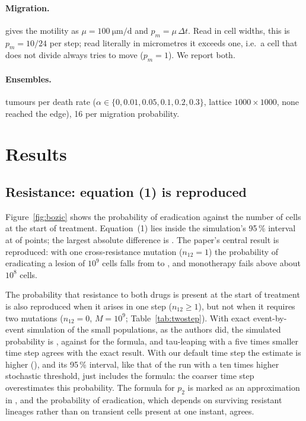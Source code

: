 \documentclass[11pt]{article}
\begin{document}
\paragraph{Migration.} \cite{poleszczuk2014} gives the motility as
$\mu=\SI{100}{\micro\meter\per\day}$ and $p_m=\mu\,\Delta t$. Read in cell widths, this is
$p_m = 10/24$ per step; read literally in micrometres it exceeds one, i.e.\ a cell that does
not divide always tries to move ($p_m=1$). We report both.

\paragraph{Ensembles.} \CATumours{} tumours per death rate ($\alpha\in\{0,0.01,0.05,0.1,0.2,0.3\}$,
lattice $1000\times1000$, none reached the edge), 16 per migration probability.

\section{Results}

\subsection{Resistance: equation (1) is reproduced}
Figure~\ref{fig:bozic} shows the probability of eradication against the number of cells at
the start of treatment. Equation~(1) lies inside the simulation's 95\,\% interval at
\BozicInside{} of \BozicPoints{} points; the largest absolute difference is \BozicMaxDiff{}.
The paper's central result is reproduced: with one cross-resistance mutation
($n_{12}=1$) the probability of eradicating a lesion of $10^9$ cells falls from
\BozicNoCross{} to \BozicOneCross{}, and monotherapy fails above about $10^8$ cells.

The probability that resistance to both drugs is present at the start of treatment is also
reproduced when it arises in one step ($n_{12}\ge 1$), but not when it requires two
mutations ($n_{12}=0$, $M=10^9$; Table~\ref{tab:twostep}). With exact event-by-event
simulation of the small populations, as the authors did, the simulated probability is
\BozicTwoStepExact{}, against \BozicTwoStepFormula{} for the formula, and tau-leaping with a
five times smaller time step agrees with the exact result. With our default time step the
estimate is higher (\BozicTwoStepSim{}), and its 95\,\% interval, like that of the run with a
ten times higher stochastic threshold, just includes the formula: the coarser time step
overestimates this probability. The formula for $p_2$ is marked as an approximation in \cite{bozic2013}, and the
probability of eradication, which depends on surviving resistant lineages rather than on
transient cells present at one instant, agrees.
\end{document}
